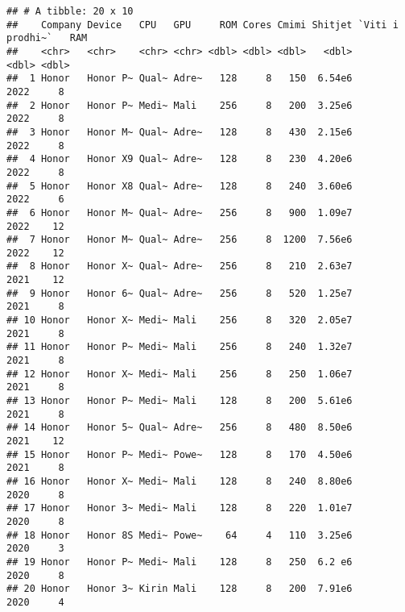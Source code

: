 \documentclass[
]{article}
\newenvironment{Shaded}{\begin{snugshade}}{\end{snugshade}}
\newcommand{\CommentTok}[1]{\textcolor[rgb]{0.56,0.35,0.01}{\textit{#1}}}
\newcommand{\NormalTok}[1]{#1}
\newcommand{\SpecialCharTok}[1]{\textcolor[rgb]{0.00,0.00,0.00}{#1}}
\begin{document}
\begin{verbatim}
## # A tibble: 20 x 10
##    Company Device   CPU   GPU     ROM Cores Cmimi Shitjet `Viti i prodhi~`   RAM
##    <chr>   <chr>    <chr> <chr> <dbl> <dbl> <dbl>   <dbl>            <dbl> <dbl>
##  1 Honor   Honor P~ Qual~ Adre~   128     8   150  6.54e6             2022     8
##  2 Honor   Honor P~ Medi~ Mali    256     8   200  3.25e6             2022     8
##  3 Honor   Honor M~ Qual~ Adre~   128     8   430  2.15e6             2022     8
##  4 Honor   Honor X9 Qual~ Adre~   128     8   230  4.20e6             2022     8
##  5 Honor   Honor X8 Qual~ Adre~   128     8   240  3.60e6             2022     6
##  6 Honor   Honor M~ Qual~ Adre~   256     8   900  1.09e7             2022    12
##  7 Honor   Honor M~ Qual~ Adre~   256     8  1200  7.56e6             2022    12
##  8 Honor   Honor X~ Qual~ Adre~   256     8   210  2.63e7             2021    12
##  9 Honor   Honor 6~ Qual~ Adre~   256     8   520  1.25e7             2021     8
## 10 Honor   Honor X~ Medi~ Mali    256     8   320  2.05e7             2021     8
## 11 Honor   Honor P~ Medi~ Mali    256     8   240  1.32e7             2021     8
## 12 Honor   Honor X~ Medi~ Mali    256     8   250  1.06e7             2021     8
## 13 Honor   Honor P~ Medi~ Mali    128     8   200  5.61e6             2021     8
## 14 Honor   Honor 5~ Qual~ Adre~   256     8   480  8.50e6             2021    12
## 15 Honor   Honor P~ Medi~ Powe~   128     8   170  4.50e6             2021     8
## 16 Honor   Honor X~ Medi~ Mali    128     8   240  8.80e6             2020     8
## 17 Honor   Honor 3~ Medi~ Mali    128     8   220  1.01e7             2020     8
## 18 Honor   Honor 8S Medi~ Powe~    64     4   110  3.25e6             2020     3
## 19 Honor   Honor P~ Medi~ Mali    128     8   250  6.2 e6             2020     8
## 20 Honor   Honor 3~ Kirin Mali    128     8   200  7.91e6             2020     4
\end{verbatim}

\begin{Shaded}
\end{Shaded}
\end{document}
